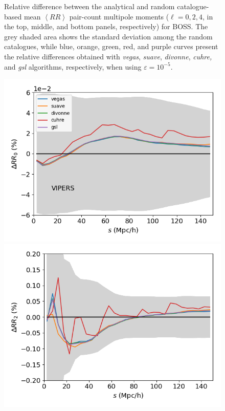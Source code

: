\documentclass{aa}
\begin{document}
\begin{figure}
    \caption{Relative difference between the analytical and random catalogue-based mean $\left<RR\right>$  pair-count multipole moments ($\ell = 0,2,4$, in the top, middle, and bottom panels, respectively) for BOSS. The grey shaded area shows the standard deviation among the random catalogues, while blue, orange, green, red, and purple curves present the relative differences obtained with \emph{vegas}, \emph{suave}, \emph{divonne}, \emph{cuhre,} and \emph{gsl} algorithms, respectively, when using $\varepsilon = 10^{-5}$.}
    \label{fig:BOSS_RR}
\end{figure}
%
\begin{figure}
\includegraphics[width=0.96\columnwidth]{Figures/reldif_RR_random_VIPERS_W1_nside65536_N_3900000_1e-5_l0.png} 
\includegraphics[width=0.96\columnwidth]{Figures/reldif_RR_random_VIPERS_W1_nside65536_N_3900000_1e-5_l2.png} 

\end{figure}
\end{document}
